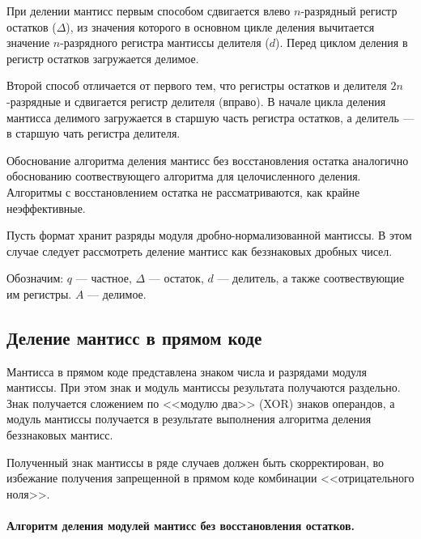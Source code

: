 При делении мантисс первым способом сдвигается влево $n$-разрядный регистр остатков ($\Delta$), из значения которого в основном цикле деления вычитается значение $n$-разрядного регистра мантиссы делителя ($d$). Перед циклом деления в регистр остатков загружается делимое.

Второй способ отличается от первого тем, что регистры остатков и делителя $2n$-разрядные и сдвигается регистр делителя (вправо). В начале цикла деления мантисса делимого загружается в старшую часть регистра остатков, а делитель --- в старшую чать регистра делителя. 

Обоснование алгоритма деления мантисс без восстановления остатка аналогично обоснованию соотвествующего алгоритма для целочисленного деления. Алгоритмы с восстановлением остатка не рассматриваются, как крайне неэффективные.

Пусть формат хранит разряды модуля дробно-нормализованной мантиссы. В этом случае следует рассмотреть деление мантисс как беззнаковых дробных чисел.

Обозначим: $q$ --- частное, $\Delta$ --- остаток, $d$ --- делитель, а также соотвествующие им регистры. $A$ --- делимое.


\subsection{Деление мантисс в прямом коде}

Мантисса в прямом коде представлена знаком числа и разрядами модуля мантиссы. При этом знак и модуль мантиссы результата получаются раздельно. Знак получается сложением по <<модулю два>> (XOR) знаков операндов, а модуль мантиссы получается в результате выполнения алгоритма деления беззнаковых мантисс.

Полученный знак мантиссы в ряде случаев должен быть скорректирован, во избежание получения запрещенной в прямом коде комбинации <<отрицательного ноля>>.

\paragraph{Алгоритм деления модулей мантисс без восстановления остатков.}

